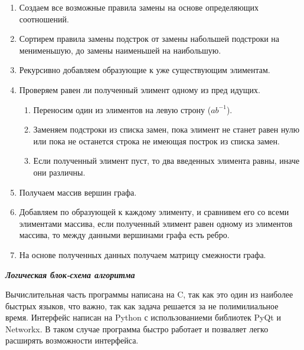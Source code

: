 \begin{enumerate}
  \item Создаем все возможные правила замены на основе определяющих соотношений.

  \item Сортирем правила замены подстрок от замены набольшей подстроки на менименьшую, до замены наименьшей на наибольшую.

  \item Рекурсивно добавляем образующие к уже существующим элиментам.

  \item Проверяем равен ли полученный элимент одному из пред идущих.

    \begin{enumerate}

      \item Переносим один из элиментов на левую строну ($ab^{-1}$).

      \item Заменяем подстроки из списка замен, пока элимент не станет равен нулю или пока не останется строка не имеющая построк из списка замен.

      \item Если полученный элимент пуст, то два введенных элимента равны, иначе они различны.

    \end{enumerate}

  \item Получаем массив вершин графа.

  \item Добавляем по образующей к каждому элименту, и сравнивем его со всеми элиментами массива, если полученный элимент равен одному из элиментов массива, то между данными вершинами графа есть ребро.

  \item На основе полученных данных получаем матрицу смежности графа.

\end{enumerate}

\newpage

\begin{center}
  \textbf{\textit{Логическая блок-схема алгоритма}}
\end{center}


\newpage

Вычислительная часть программы написана на C, так как это один из наиболее быстрых языков, что важно, так как задача решается за не полимилиальное время. Интерфейс написан на Python с использованиеми библиотек PyQt и Networkx. В таком случае программа быстро работает и позваляет легко расширять возможности интерфейса.

